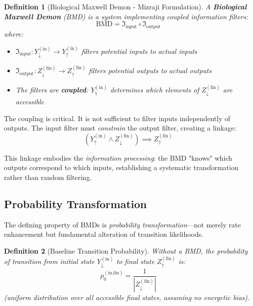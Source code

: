 \documentclass[12pt,a4paper]{article}
\newtheorem{definition}{Definition}
\begin{document}
\begin{definition}[Biological Maxwell Demon - Mizraji Formulation]
\label{def:bmd_mizraji}
A \textbf{Biological Maxwell Demon} (BMD) is a system implementing coupled information filters:
\begin{equation}
\text{BMD} = \Im_{\text{input}} \circ \Im_{\text{output}}
\end{equation}
where:
\begin{itemize}
\item $\Im_{\text{input}}: Y_{\downarrow}^{(\text{in})} \to Y_{\uparrow}^{(\text{in})}$ filters potential inputs to actual inputs
\item $\Im_{\text{output}}: Z_{\downarrow}^{(\text{fin})} \to Z_{\uparrow}^{(\text{fin})}$ filters potential outputs to actual outputs
\item The filters are \textbf{coupled}: $Y_{\uparrow}^{(\text{in})}$ determines which elements of $Z_{\downarrow}^{(\text{fin})}$ are accessible
\end{itemize}
\end{definition}

The coupling is critical. It is not sufficient to filter inputs independently of outputs. The input filter must \textit{constrain} the output filter, creating a linkage:
\begin{equation}
(Y_{\uparrow}^{(\text{in})} \wedge Z_{\downarrow}^{(\text{fin})}) \implies Z_{\uparrow}^{(\text{fin})}
\end{equation}

This linkage embodies the \textit{information processing}: the BMD "knows" which outputs correspond to which inputs, establishing a systematic transformation rather than random filtering.

\subsection{Probability Transformation}

The defining property of BMDs is \textit{probability transformation}—not merely rate enhancement but fundamental alteration of transition likelihoods.

\begin{definition}[Baseline Transition Probability]
\label{def:baseline_prob}
Without a BMD, the probability of transition from initial state $Y_{\downarrow}^{(\text{in})}$ to final state $Z_{\uparrow}^{(\text{fin})}$ is:
\begin{equation}
p_0^{(\text{in,fin})} = \frac{1}{|Z_{\downarrow}^{(\text{fin})}|}
\end{equation}
(uniform distribution over all accessible final states, assuming no energetic bias).
\end{definition}
\end{document}
